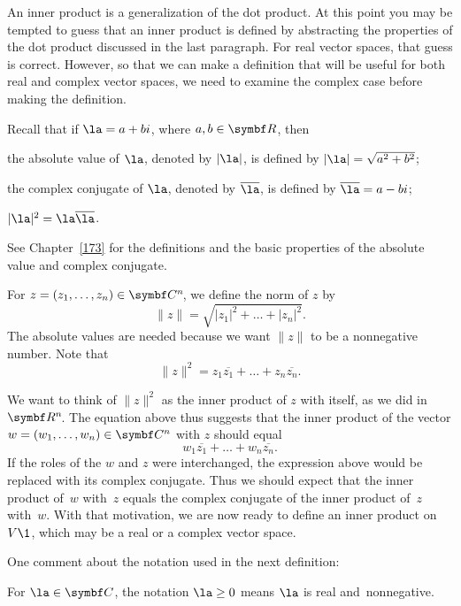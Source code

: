 An inner product is a generalization of the dot product.  At this point you may
be tempted to guess that an inner product is defined by abstracting the
properties of the dot product discussed in the last paragraph.  For real vector
spaces, that guess is correct.  However, so that we can make a definition that will
be useful for both real and complex vector spaces, we need to examine the
complex case before making the definition.

\pagebreak[1]

Recall that if $\la = a + bi$, where $a, b \in \R{}$, then
\begin{Itemize}
\item
the absolute value of $\la$, denoted by $|\la|$, is defined by $|\la| = \sqrt{a^2 + b^2}$;
\item
the complex conjugate of $\la$, denoted by $\bar{\la}$, is defined by $\bar{\la} = a - bi$;
\item
$|\la|^2 = \la \bar{\la}$.
\end{Itemize}
See Chapter~\ref{173} for the definitions and the
basic properties of the absolute value and complex conjugate.

For
\mbox{$z = (z_1, \dots, z_n) \in \CC{n}$}, we define the norm of $z$ by
\[
\|z\| = \sqrt{|z_1|^2 + \dots + |z_n|^2}.
\]
The absolute values are needed because we want $\|z\|$ to be a nonnegative
number.  Note that
\[
\|z\|^2 = z_1 \overline{z_1} + \dots + z_n \overline{z_n}.
\]

We want to think of $\|z\|^2$ as the inner product of $z$ with itself, as we did
in~$\RR{n}$.  The equation above thus suggests that the inner product of the vector
\mbox{$w = (w_1, \dots, w_n) \in \C{n}$} with $z$ should equal
\[
w_1 \overline{z_1}+ \dots + w_n \overline{z_n}.
\]
If the roles of the $w$ and $z$ were interchanged, the expression above would be
replaced with its complex conjugate. Thus we should expect that the
inner product of~$w$ with~$z$ equals the complex conjugate of the inner product
of~$z$ with~$w$.  With that motivation, we are now ready to define an inner
product on~$V\1$, which may be a real or a complex vector space.

One comment about the notation used in the next definition:
\begin{Itemize}
\item
For $\la\in\C{}$, the notation $\la \ge 0$ means $\la$ is real and~nonnegative.
\end{Itemize}

